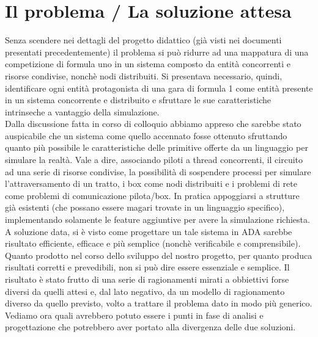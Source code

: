 \section{Il problema / La soluzione attesa}
Senza scendere nei dettagli del progetto didattico (già visti nei documenti presentati precedentemente) il problema si può ridurre ad una mappatura di una competizione di formula uno in un sistema composto da entità concorrenti e risorse condivise, nonchè nodi distribuiti.
Si presentava necessario, quindi, identificare ogni entità protagonista di una gara di formula 1 come entità presente in un sistema concorrente e distribuito e sfruttare le sue caratteristiche intrinseche a vantaggio della simulazione.\\
Dalla discussione fatta in corso di colloquio abbiamo appreso che sarebbe stato auspicabile che un sistema come quello accennato fosse ottenuto sfruttando quanto più possibile le caratteristiche delle primitive offerte da un linguaggio per simulare la realtà. Vale a dire, associando piloti a thread concorrenti, il circuito ad una serie di risorse condivise, la possibilità di sospendere processi per simulare l’attraversamento di un tratto, i box come nodi distribuiti e i problemi di rete come problemi di comunicazione pilota/box. In pratica appoggiarsi a strutture già esistenti (che possano essere magari trovate in un linguaggio specifico), implementando solamente le feature aggiuntive per avere la simulazione richiesta.
A soluzione data, si è visto come progettare un tale sistema in ADA sarebbe risultato efficiente, efficace e più semplice (nonchè verificabile e comprensibile).\\
Quanto prodotto nel corso dello sviluppo del nostro progetto, per quanto produca risultati corretti e prevedibili, non si può dire essere essenziale e semplice. Il risultato è stato frutto di una serie di ragionamenti mirati a obbiettivi forse diversi da quelli attesi e, dal lato negativo, da un modello di ragionamento diverso da quello previsto, volto a trattare il problema dato in modo più generico. Vediamo ora quali avrebbero potuto essere i punti in fase di analisi e progettazione che potrebbero aver portato alla divergenza delle due soluzioni.